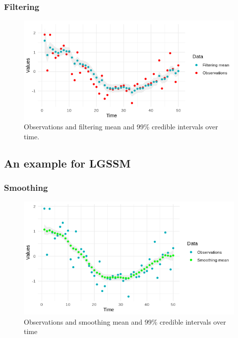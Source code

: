 \documentclass[xcolor=dvipsnames, compress]{beamer}
\begin{document}
\begin{frame}
\frametitle{Filtering}
\begin{figure}
	\includegraphics[scale=0.7]{filtermean_obs.png}
	\caption{Observations and filtering mean and 99\% credible intervals over time.}
\end{figure}
\end{frame}

\begin{frame}
\section{An example for LGSSM}
\frametitle{Smoothing}
\begin{figure}
	\includegraphics[scale=0.7]{smoothmean_obs.png}
	\caption{Observations and smoothing mean and 99\% credible intervals over time}
\end{figure}
\end{frame}

%
 
\end{document}
